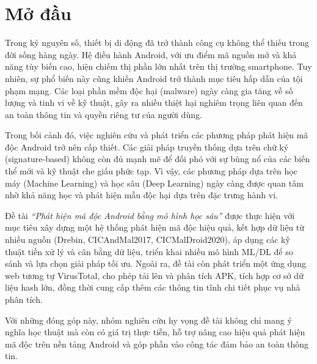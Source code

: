 \chapter*{Mở đầu}

\begingroup
  \setcounter{section}{0}
  \setcounter{secnumdepth}{2}
  \setcounter{tocdepth}{2}
  \renewcommand{\thesection}{\arabic{section}.}
  \renewcommand{\thesubsection}{\thesection\arabic{subsection}.}

Trong kỷ nguyên số, thiết bị di động đã trở thành công cụ không thể thiếu trong đời sống hàng ngày. Hệ điều hành Android, với ưu điểm mã nguồn mở và khả năng tùy biến cao, hiện chiếm thị phần lớn nhất trên thị trường smartphone. Tuy nhiên, sự phổ biến này cũng khiến Android trở thành mục tiêu hấp dẫn của tội phạm mạng. Các loại phần mềm độc hại (malware) ngày càng gia tăng về số lượng và tinh vi về kỹ thuật, gây ra nhiều thiệt hại nghiêm trọng liên quan đến an toàn thông tin và quyền riêng tư của người dùng.

Trong bối cảnh đó, việc nghiên cứu và phát triển các phương pháp phát hiện mã độc Android trở nên cấp thiết. Các giải pháp truyền thống dựa trên chữ ký (signature-based) không còn đủ mạnh mẽ để đối phó với sự bùng nổ của các biến thể mới và kỹ thuật che giấu phức tạp. Vì vậy, các phương pháp dựa trên học máy (Machine Learning) và học sâu (Deep Learning) ngày càng được quan tâm nhờ khả năng học và phát hiện mẫu độc hại dựa trên đặc trưng hành vi.

Đề tài \textit{``Phát hiện mã độc Android bằng mô hình học sâu''} được thực hiện với mục tiêu xây dựng một hệ thống phát hiện mã độc hiệu quả, kết hợp dữ liệu từ nhiều nguồn (Drebin, CICAndMal2017, CICMalDroid2020), áp dụng các kỹ thuật tiền xử lý và cân bằng dữ liệu, triển khai nhiều mô hình ML/DL để so sánh và lựa chọn giải pháp tối ưu. Ngoài ra, đề tài còn phát triển một ứng dụng web tương tự VirusTotal, cho phép tải lên và phân tích APK, tích hợp cơ sở dữ liệu hash lớn, đồng thời cung cấp thêm các thông tin tĩnh chi tiết phục vụ nhà phân tích.

Với những đóng góp này, nhóm nghiên cứu hy vọng đề tài không chỉ mang ý nghĩa học thuật mà còn có giá trị thực tiễn, hỗ trợ nâng cao hiệu quả phát hiện mã độc trên nền tảng Android và góp phần vào công tác đảm bảo an toàn thông tin.
